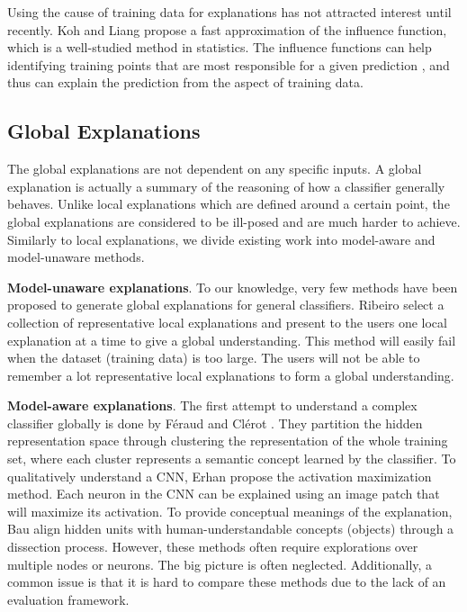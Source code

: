 
Using the cause of training data for explanations has not attracted interest until recently. Koh and Liang propose a fast approximation of the influence function, which is a well-studied method in statistics. The influence functions can help identifying training points that are most responsible for a given prediction \cite{koh2017influencefunctions}, and thus can explain the prediction from the aspect of training data.
 
\subsection{Global Explanations}
The global explanations are not dependent on any specific inputs. A global explanation is actually a summary of the reasoning of how a classifier generally behaves. Unlike local explanations which are defined around a certain point, the global explanations are considered to be ill-posed and are much harder to achieve. Similarly to local explanations, we divide existing work into model-aware and model-unaware methods.

\textbf{Model-unaware explanations}. To our knowledge, very few methods have been proposed to generate global explanations for general classifiers. Ribeiro \etal \cite{ribeiro2016kdd} select a collection of representative local explanations and present to the users one local explanation at a time to give a global understanding. This method will easily fail when the dataset (training data) is too large. The users will not be able to remember a lot representative local explanations to form a global understanding.


\textbf{Model-aware explanations}. The first attempt to understand a complex classifier globally is done by F{\'e}raud and Cl{\'e}rot \cite{feraud2002nn}. They partition the hidden representation space through clustering the representation of the whole training set, where each cluster represents a semantic concept learned by the classifier. To qualitatively understand a CNN, Erhan \etal \cite{erhan2009techreport} propose the activation maximization method. Each neuron in the CNN can be explained using an image patch that will maximize its activation. 
To provide conceptual meanings of the explanation, Bau \etal \cite{bau2017netdissect} align hidden units with human-understandable concepts (objects) through a dissection process. However, these methods often require explorations over multiple nodes or neurons. The big picture is often neglected. Additionally, a common issue is that it is hard to compare these methods due to the lack of an evaluation framework.

